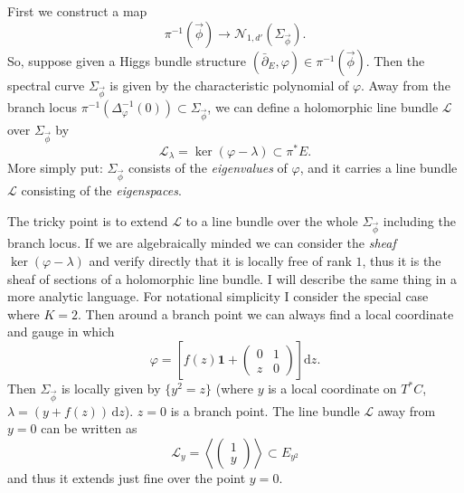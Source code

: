 \documentclass[12pt,letterpaper,reqno]{article}
\numberwithin{equation}{section}
\newcommand{\cL}{\ensuremath{\mathcal L}}
\newcommand{\cN}{\ensuremath{\mathcal N}}
\newcommand\bid{{\mathbf 1}}
\newcommand{\de}{\mathrm{d}}
\newcommand{\ti}[1]{\textit{#1}}
\begin{document}
\begin{pf} First we construct a map 
\begin{equation}
  \pi^{-1}(\vec\phi) \to \cN_{1,d'}(\Sigma_{\vec\phi}).
\end{equation}
So, suppose given a Higgs bundle structure
$(\bar\partial_E,\varphi) \in \pi^{-1}(\vec\phi)$. 
Then the spectral
curve $\Sigma_{\vec\phi}$ is given by the characteristic polynomial
of $\varphi$. Away from the branch locus
 $\pi^{-1}(\Delta_\varphi^{-1}(0)) \subset \Sigma_{\vec\phi}$, we can
define a holomorphic line bundle $\cL$ over $\Sigma_{\vec\phi}$ by
\begin{equation}
 \cL_\lambda = \ker(\varphi - \lambda) \subset \pi^* E. 
\end{equation}
More simply put: 
$\Sigma_{\vec\phi}$ consists of the \ti{eigenvalues} of $\varphi$,
and it carries a line bundle $\cL$ consisting of the \ti{eigenspaces}.

The tricky point is to extend
$\cL$ to a line bundle over the whole $\Sigma_{\vec\phi}$ 
including the branch locus.
If we are algebraically minded we can consider the
\ti{sheaf} $\ker(\varphi-\lambda)$ and verify directly that it is
locally free of rank $1$, thus it is the sheaf of sections of a
holomorphic line bundle. I will describe the same thing in a more 
analytic language. For notational simplicity I consider the special case
where $K=2$. Then around a branch point 
we can always find a local coordinate and gauge in which
\begin{equation}
   \varphi = \left[f(z) \bid + \begin{pmatrix} 0 & 1 \\ z & 0 \end{pmatrix}\right] \de z.
\end{equation}
Then $\Sigma_{\vec\phi}$ is locally
given by $\{y^2 = z\}$ (where $y$ is a local coordinate on $T^*C$, $\lambda = (y+f(z)) \, \de z$). $z = 0$ is a branch point.
The line bundle $\cL$ away from $y=0$ can be written as
\begin{equation}
  \cL_y = \left\langle   \begin{pmatrix} 1 \\ y  \end{pmatrix}
\right\rangle  \subset E_{y^2}
\end{equation}
and thus it extends just fine over the point $y=0$.


\end{pf}
\end{document}
